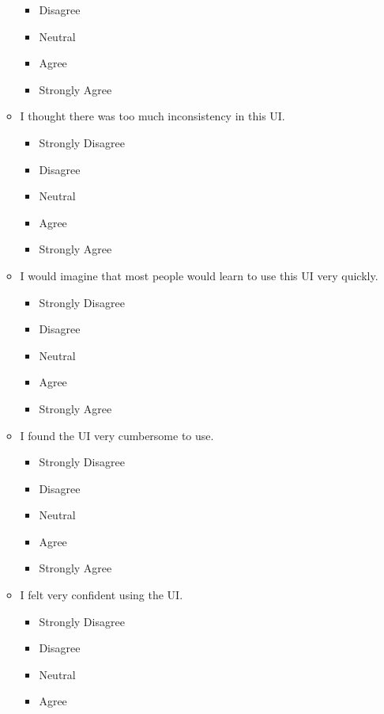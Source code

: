 \documentclass[doublespace,draft,nopageskip]{VTthesis} %
\begin{document}
\begin{itemize}
\begin{itemize}
\begin{itemize}
                \item Disagree
                \item Neutral
                \item Agree
                \item Strongly Agree
            \end{itemize}
        \item I thought there was too much inconsistency in this UI.
            \begin{itemize}
                \item Strongly Disagree
                \item Disagree
                \item Neutral
                \item Agree
                \item Strongly Agree
            \end{itemize}
        \item I would imagine that most people would learn to use this UI very quickly.
            \begin{itemize}
                \item Strongly Disagree
                \item Disagree
                \item Neutral
                \item Agree
                \item Strongly Agree
            \end{itemize}
        \item I found the UI very cumbersome to use.
            \begin{itemize}
                \item Strongly Disagree
                \item Disagree
                \item Neutral
                \item Agree
                \item Strongly Agree
            \end{itemize}
	\item I felt very confident using the UI.
            \begin{itemize}
                \item Strongly Disagree
                \item Disagree
                \item Neutral
                \item Agree

\end{itemize}
\end{itemize}
\end{itemize}
\end{document}
